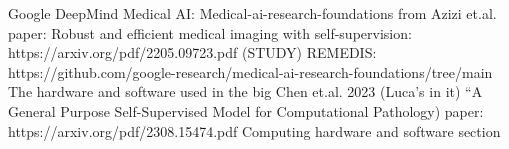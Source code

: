 \documentclass{article}%
\begin{document}
%
Google DeepMind Medical AI: Medical{-}ai{-}research{-}foundations from Azizi et.al. paper: Robust and efficient medical imaging with self{-}supervision: https://arxiv.org/pdf/2205.09723.pdf (STUDY)%
\newline%
\newline%
%
REMEDIS: https://github.com/google{-}research/medical{-}ai{-}research{-}foundations/tree/main %
\newline%
\newline%
%
The hardware and software used in the big Chen et.al. 2023 (Luca’s in it) “A General Purpose Self{-}Supervised Model for Computational Pathology) paper: https://arxiv.org/pdf/2308.15474.pdf %
\newline%
\newline%
%
Computing hardware and software section%
\newline%
\newline%
%
\end{document}

